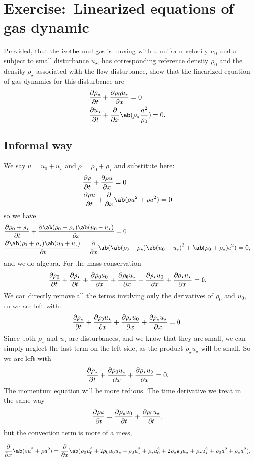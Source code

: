 \documentclass[justified, nobib,a4paper]{tufte-handout}
\newcommand{\Q}[1]{\section{Exercise:~{#1}}}
\begin{document}
\Q{Linearized equations of gas dynamic}
\def\rs{\rho_\star}
\def\rz{\rho_0}
\def\us{u_\star}
\def\uz{u_0}
Provided, that the isothermal gas is moving with a uniform velocity \(\uz\) and a subject
to small disturbance \(\us\), has corresponding reference density \(\rz\) and
the density \(\rs\) associated with the flow disturbance, show that the linearized
equation of gas dynamics for this disturbance are
\begin{equation}
	\begin{split}
		 & \pdv{\rs}{t} + \pdv{\rz \us}{x} = 0                   \\
		 & \pdv{\us}{t} + \pdv{}{x}\ab(\rs \frac{a^2}{\rz}) = 0.
	\end{split}\label{eq:lin-eul}
\end{equation}
\subsection{Informal way}
We say \(u = \uz + \us\) and \(\rho = \rz + \rs\) and substitute here:
\[
	\begin{split}
		 & \pdv{\rho}{t} + \pdv{\rho u}{x} = 0                     \\
		 & \pdv{\rho u}{t} + \pdv{}{x}\ab(\rho u^2 + \rho a^2) = 0
	\end{split}
\]
so we have
\[
	\begin{split}
		 & \pdv{\rz + \rs}{t} + \pdv{\ab(\rz + \rs) \ab(\uz + \us)}{x} = 0                                                    \\
		 & \pdv{\ab(\rz + \rs) \ab(\uz + \us)}{t} + \pdv{}{x}\ab(\ab(\rz + \rs) {\ab(\uz + \us)}^2 + \ab(\rz + \rs) a^2) = 0,
	\end{split}
\]
and we do algebra. For the mass conservation
\[
	\pdv{\rz}{t} + \pdv{\rs}{t} + \pdv{\rz\uz}{x} + \pdv{\rz\us}{x} + \pdv{\rs\uz}{x} + \pdv{\rs\us}{x}= 0.
\]
We can directly remove all the terms involving only the derivatives of \(\rz\) and \(\uz\),
so we are left with:
\[
	\pdv{\rs}{t} + \pdv{\rz\us}{x} + \pdv{\rs\uz}{x} + \pdv{\rs\us}{x}= 0.
\]
Since both \(\rs\) and \(\us\) are disturbances, and we know that they are small, we can
simply neglect the last term on the left side, as the product \(\rs \us\) will be 
small.
So we are left with
\[
	\pdv{\rs}{t} + \pdv{\rz\us}{x} + \pdv{\rs\uz}{x} = 0.
\]
The momentum equation will be more tedious. The time derivative we treat in the same way
\[
	\pdv{\rho u}{t} = \pdv{\rs \uz}{t} + \pdv{\rz \us}{t},
\]
but the convection term is more of a mess,
\begin{fullwidth}
	\[
		\begin{split}
			\pdv{}{x}\ab(\rho u^2 + \rho a^2) =
			\pdv{}{x}\ab( \rz\uz^2 + 2\rz\uz\us + \rz\us^2  + \rs\uz^2 + 2\rs\uz\us + \rs\us^2 + \rz a^2 + \rs a^2),
		\end{split}
	\]
\end{fullwidth}
\end{document}
